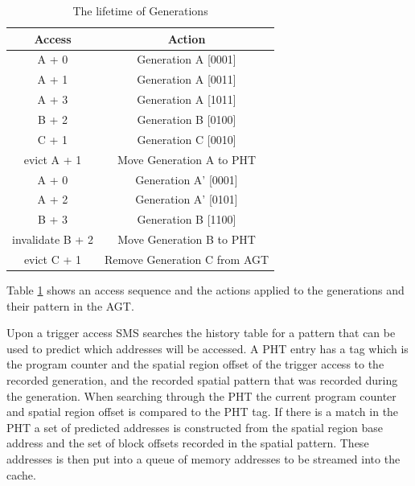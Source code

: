 \begin{table}[htbp]
  \centering
  \begin{tabular}{| c | c |}
    \hline
    {\bf Access} & {\bf Action} \\ \hline
    A + 0 & Generation A [0001]\\ \hline
    A + 1 & Generation A [0011]\\ \hline
    A + 3 & Generation A [1011]\\ \hline
    B + 2 & Generation B [0100]\\ \hline
    C + 1 & Generation C [0010] \\ \hline
    evict A + 1 & Move Generation A to PHT\\ \hline
    A + 0 & Generation A' [0001]\\ \hline
    A + 2 & Generation A' [0101]\\ \hline
    B + 3 & Generation B [1100] \\ \hline
    invalidate B + 2 & Move Generation B to PHT\\ \hline
    evict C + 1 & Remove Generation C from AGT \\ \hline    
  \end{tabular}
  \caption{The lifetime of Generations}
  \label{tab:generation}
\end{table}
Table \ref{tab:generation} shows an access sequence and the
actions applied to the generations and their pattern in the AGT.

Upon a trigger access SMS searches the history table for a pattern
that can be used to predict which addresses will be accessed.  A PHT
entry has a tag which is the program counter and the spatial region
offset of the trigger access to the recorded generation, and the
recorded spatial pattern that was recorded during the generation.
When searching through the PHT the current program counter and spatial
region offset is compared to the PHT tag. If there is a match in the
PHT a set of predicted addresses is constructed from the spatial
region base address and the set of block offsets recorded in the
spatial pattern. These addresses is then put into a queue of memory
addresses to be streamed into the cache.
